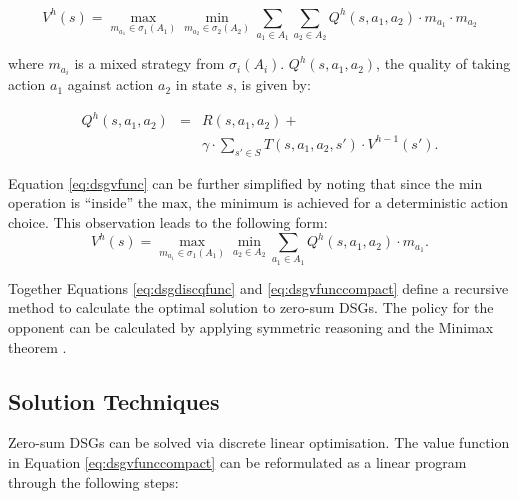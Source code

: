 {\small
\abovedisplayskip=0pt
\belowdisplayskip=0pt
\begin{equation}
\label{eq:dsgvfunc}
  V^{h}(s) = \max_{m_{a_{1}} \in \sigma_1(A_1)}\min_{m_{a_{2}} \in \sigma_2(A_2)} \sum_{a_1 \in A_1} \sum_{a_2 \in A_2} Q^{h}(s, a_1, a_2) \cdot m_{a_{1}} \cdot m_{a_{2}}
\end{equation}
}%

where $m_{a_i}$ is a mixed strategy from $\sigma_i(A_i)$. 
$Q^{h}(s, a_1, a_2)$, the quality of taking action $a_1$ against action $a_2$ in state $s$,
is given by:

{\small 
\abovedisplayskip=0pt
\belowdisplayskip=0pt
\begin{eqnarray}
\label{eq:dsgdiscqfunc}
  Q^{h}(s, a_1, a_2) &=& R(s, a_1, a_2) + \nonumber \\
  && \gamma \cdot \sum_{s' \in S} T(s, a_1, a_2, s') \cdot V^{h-1}(s').
\end{eqnarray}
}%

Equation \eqref{eq:dsgvfunc} can be further simplified by noting that
since the $\text{min}$ operation is ``inside'' the $\text{max}$, the minimum is achieved
for a deterministic action choice. This observation leads to the following
form:
{\small 
\abovedisplayshortskip =100pt
\belowdisplayshortskip =0pt
\begin{equation}
\label{eq:dsgvfunccompact}
  V^{h}(s) = \max_{m_{a_{1}} \in \sigma_1(A_1)} \min_{a_2 \in A_2} \sum_{a_1 \in A_1} Q^{h}(s, a_1, a_2) \cdot m_{a_1}.
\end{equation}
}%

Together Equations \eqref{eq:dsgdiscqfunc} and \eqref{eq:dsgvfunccompact}
define a recursive method to calculate the optimal solution to zero-sum
DSGs. The policy for the opponent can be calculated by applying symmetric
reasoning and the Minimax theorem \cite{Neumann_MA_1928}. 

\subsection{Solution Techniques}
\label{subsec:dsgsolution}

Zero-sum DSGs can be solved via discrete linear optimisation. The value
function in Equation \eqref{eq:dsgvfunccompact} can be reformulated as a linear
program through the following steps:

